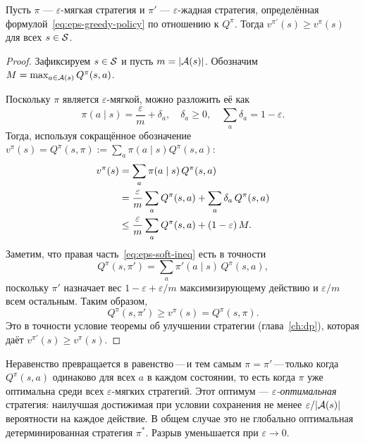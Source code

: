 \begin{theorem}
\label{thm:eps-soft-improvement}
Пусть $\pi$ --- $\varepsilon$-мягкая стратегия и $\pi'$ --- $\varepsilon$-жадная стратегия, определённая формулой~\eqref{eq:eps-greedy-policy} по отношению к $Q^\pi$.  Тогда $v^{\pi'}(s) \ge v^\pi(s)$ для всех $s \in \mathcal{S}$.
\end{theorem}

\begin{proof}
Зафиксируем $s \in \mathcal{S}$ и пусть $m = |\mathcal{A}(s)|$.  Обозначим $M = \max_{a \in \mathcal{A}(s)} Q^\pi(s, a)$.

Поскольку $\pi$ является $\varepsilon$-мягкой, можно разложить её как
\[
  \pi(a \mid s) = \frac{\varepsilon}{m} + \delta_a, \quad \delta_a \ge 0, \quad \sum_a \delta_a = 1 - \varepsilon.
\]
Тогда, используя сокращённое обозначение $v^\pi(s) = Q^\pi(s, \pi) := \sum_a \pi(a \mid s) Q^\pi(s, a)$:
\begin{align}
  v^\pi(s)
  &= \sum_{a} \pi(a \mid s)\,Q^\pi(s, a) \notag \\
  &= \frac{\varepsilon}{m} \sum_a Q^\pi(s, a) + \sum_a \delta_a\,Q^\pi(s, a) \notag \\
  &\le \frac{\varepsilon}{m} \sum_a Q^\pi(s, a) + (1 - \varepsilon)\,M. \label{eq:eps-soft-ineq}
\end{align}
Заметим, что правая часть~\eqref{eq:eps-soft-ineq} есть в точности
\[
  Q^\pi(s, \pi') = \sum_a \pi'(a \mid s)\,Q^\pi(s, a),
\]
поскольку $\pi'$ назначает вес $1 - \varepsilon + \varepsilon/m$ максимизирующему действию и $\varepsilon/m$ всем остальным.  Таким образом,
\[
  Q^\pi(s, \pi') \ge v^\pi(s) = Q^\pi(s, \pi).
\]
Это в точности условие теоремы об улучшении стратегии (глава~\ref{ch:dp}), которая даёт $v^{\pi'}(s) \ge v^\pi(s)$.
\end{proof}

\begin{remark}
Неравенство превращается в равенство\,---\,и тем самым $\pi = \pi'$\,---\,только когда $Q^\pi(s, a)$ одинаково для всех $a$ в каждом состоянии, то есть когда $\pi$ уже оптимальна среди всех $\varepsilon$-мягких стратегий.  Этот оптимум --- \emph{$\varepsilon$-оптимальная} стратегия: наилучшая достижимая при условии сохранения не менее $\varepsilon/|\mathcal{A}(s)|$ вероятности на каждое действие.  В общем случае это не глобально оптимальная детерминированная стратегия $\pi^*$.  Разрыв уменьшается при $\varepsilon \to 0$.
\end{remark}


